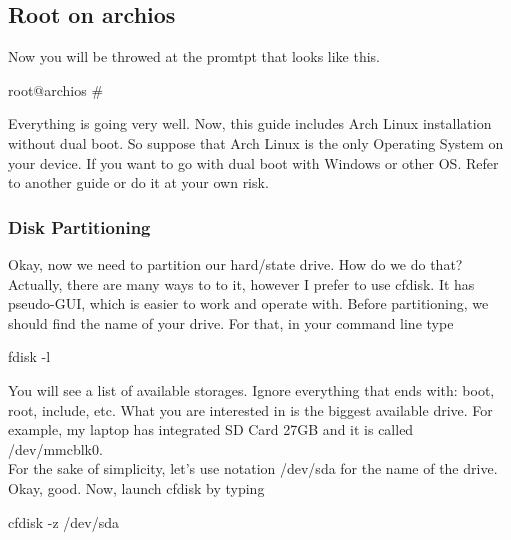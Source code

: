 \documentclass{article}
\begin{document}
\subsection{Root on archios}

Now you will be throwed at the promtpt that looks like this.\\

\begin{center}
  root@archios \#\\
\end{center}

Everything is going very well. Now, this guide includes Arch Linux installation without dual boot. So suppose that Arch Linux is the only Operating System on your device. If you want to go with dual boot with Windows or other OS. Refer to another guide or do it at your own risk.\\

\subsubsection{Disk Partitioning}

Okay, now we need to partition our hard/state drive. How do we do that?\\

Actually, there are many ways to to it, however I prefer to use cfdisk. It has pseudo-GUI, which is easier to work and operate with. Before partitioning, we should find the name of your drive. For that, in your command line type\\

\begin{center}
  fdisk -l\\
  \end{center}

You will see a list of available storages. Ignore everything that ends with: boot, root, include, etc. What you are interested in is the biggest available drive. For example, my laptop has integrated SD Card 27GB and it is called /dev/mmcblk0.\\

For the sake of simplicity, let's use notation /dev/sda for the name of the drive.\\

Okay, good. Now, launch cfdisk by typing\\

\begin{center}
  cfdisk -z /dev/sda\\
\end{center}
\end{document}
